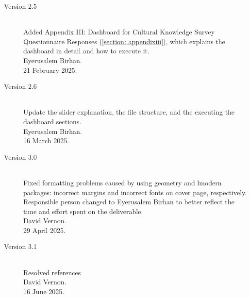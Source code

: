 \documentclass{CSSRforAfrica}
\begin{document}
\begin{description}
\item [Version 2.5]~ \\
Added Appendix III: Dashboard for Cultural Knowledge Survey Questionnaire Responses (\ref{section: appendixiii}), which explains the dashboard in detail and how to execute it.\\
Eyerusalem Birhan.\\
21 February 2025. 

\item [Version 2.6]~ \\
Update the slider explanation, the file structure, and the executing the dashboard sections. \\
Eyerusalem Birhan.\\
16 March 2025. 

\newpage

\item [Version 3.0]~ \\
Fixed formatting problems caused by using geometry and lmodern packages: incorrect margins and incorrect fonts on cover page, respectively. \\
Responsible person changed to Eyerusalem Birhan to better reflect the time and effort spent on the deliverable.\\
David Vernon.\\
29 April 2025. 

\item [Version 3.1]~ \\
Resolved references\\
David Vernon.\\
16 June 2025. 

\end{description}
\end{document}
